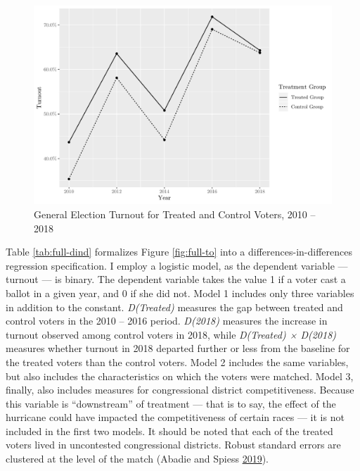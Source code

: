 \documentclass[
  12pt,
]{article}
\begin{document}
\begin{figure}[H]

{\centering \includegraphics{hurricane_michael_files/figure-latex/full-to-chunk-1} 

}

\caption{\label{fig:full-to}General Election Turnout for Treated and Control Voters, 2010 -- 2018}\label{fig:full-to-chunk}
\end{figure}

Table \ref{tab:full-dind} formalizes Figure \ref{fig:full-to} into a differences-in-differences regression specification. I employ a logistic model, as the dependent variable --- turnout --- is binary. The dependent variable takes the value 1 if a voter cast a ballot in a given year, and 0 if she did not. Model 1 includes only three variables in addition to the constant. \emph{D(Treated)} measures the gap between treated and control voters in the 2010 -- 2016 period. \emph{D(2018)} measures the increase in turnout observed among control voters in 2018, while \emph{D(Treated) × D(2018)} measures whether turnout in 2018 departed further or less from the baseline for the treated voters than the control voters. Model 2 includes the same variables, but also includes the characteristics on which the voters were matched. Model 3, finally, also includes measures for congressional district competitiveness. Because this variable is ``downstream'' of treatment --- that is to say, the effect of the hurricane could have impacted the competitiveness of certain races --- it is not included in the first two models. It should be noted that each of the treated voters lived in uncontested congressional districts. Robust standard errors are clustered at the level of the match (Abadie and Spiess \protect\hyperlink{ref-Abadie2019}{2019}).
\end{document}
